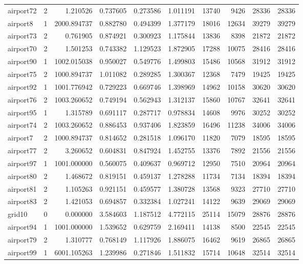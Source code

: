 \begin{longtable}{|l|r|r|r|r|r|r|r|r|r|}
airport72 & 2 & 1.210526 & 0.737605 & 0.273586 & 1.011191 & 13740 & 9426 & 28336 & 28336 \\
airport8 & 1 & 2000.894737 & 0.882780 & 0.494399 & 1.377179 & 18016 & 12634 & 39279 & 39279 \\
airport73 & 2 & 0.761905 & 0.874921 & 0.300923 & 1.175844 & 13836 & 8398 & 21872 & 21872 \\
airport70 & 2 & 1.501253 & 0.743382 & 1.129523 & 1.872905 & 17288 & 10075 & 28416 & 28416 \\
airport90 & 1 & 1002.015038 & 0.950027 & 0.549776 & 1.499803 & 15486 & 10568 & 31912 & 31912 \\
airport75 & 2 & 1000.894737 & 1.011082 & 0.289285 & 1.300367 & 12368 & 7479 & 19425 & 19425 \\
airport92 & 1 & 1001.776942 & 0.729223 & 0.669746 & 1.398969 & 14962 & 10158 & 30620 & 30620 \\
airport76 & 2 & 1003.260652 & 0.749194 & 0.562943 & 1.312137 & 15860 & 10767 & 32641 & 32641 \\
airport95 & 1 & 1.315789 & 0.691117 & 0.287717 & 0.978834 & 14608 & 9976 & 30252 & 30252 \\
airport74 & 2 & 1003.260652 & 0.886453 & 0.937406 & 1.823859 & 16496 & 11238 & 34006 & 34006 \\
airport7 & 2 & 1000.894737 & 0.814652 & 0.281518 & 1.096170 & 11820 & 7079 & 18595 & 18595 \\
airport77 & 2 & 3.260652 & 0.604831 & 0.847924 & 1.452755 & 13376 & 7892 & 21556 & 21556 \\
airport97 & 1 & 1001.000000 & 0.560075 & 0.409637 & 0.969712 & 12950 & 7510 & 20964 & 20964 \\
airport80 & 2 & 1.468672 & 0.819151 & 0.459137 & 1.278288 & 11734 & 7134 & 18394 & 18394 \\
airport81 & 2 & 1.105263 & 0.921151 & 0.459577 & 1.380728 & 13568 & 9323 & 27710 & 27710 \\
airport83 & 2 & 1.421053 & 0.694857 & 0.332384 & 1.027241 & 14122 & 9639 & 29069 & 29069 \\
grid10 & 0 & 0.000000 & 3.584603 & 1.187512 & 4.772115 & 25114 & 15079 & 28876 & 28876 \\
airport94 & 1 & 1001.000000 & 1.539652 & 0.629759 & 2.169411 & 14138 & 8500 & 22545 & 22545 \\
airport79 & 2 & 1.310777 & 0.768149 & 1.117926 & 1.886075 & 16462 & 9619 & 26865 & 26865 \\
airport99 & 1 & 6001.105263 & 1.239986 & 0.271846 & 1.511832 & 15714 & 10648 & 32514 & 32514 \\

\end{longtable}
